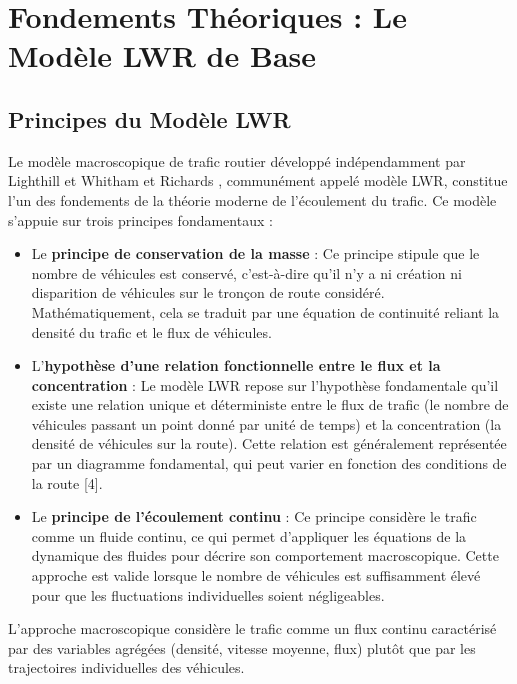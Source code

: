 \chapter{Fondements Théoriques : Le Modèle LWR de Base}
\label{chap:fondements_theoriques}

\section{Principes du Modèle LWR}
\label{sec:principes_lwr}

Le modèle macroscopique de trafic routier développé indépendamment par Lighthill et Whitham \cite{lighthill1955kinematic} et Richards \cite{richards1956shock}, communément appelé modèle LWR, constitue l'un des fondements de la théorie moderne de l'écoulement du trafic. Ce modèle s'appuie sur trois principes fondamentaux :

\begin{itemize}
    \item Le \textbf{principe de conservation de la masse}  : Ce principe stipule que le nombre de véhicules est conservé, c'est-à-dire qu'il n'y a ni création ni disparition de véhicules sur le tronçon de route considéré. Mathématiquement, cela se traduit par une équation de continuité reliant la densité du trafic et le flux de véhicules.
    \item L'\textbf{hypothèse d'une relation fonctionnelle entre le flux et la concentration}  : Le modèle LWR repose sur l'hypothèse fondamentale qu'il existe une relation unique et déterministe entre le flux de trafic (le nombre de véhicules passant un point donné par unité de temps) et la concentration (la densité de véhicules sur la route). Cette relation est généralement représentée par un diagramme fondamental, qui peut varier en fonction des conditions de la route [4].
    \item Le \textbf{principe de l'écoulement continu} : Ce principe considère le trafic comme un fluide continu, ce qui permet d'appliquer les équations de la dynamique des fluides pour décrire son comportement macroscopique. Cette approche est valide lorsque le nombre de véhicules est suffisamment élevé pour que les fluctuations individuelles soient négligeables.
\end{itemize}

\begin{definition}
    L'approche macroscopique considère le trafic comme un flux continu caractérisé par des variables agrégées (densité, vitesse moyenne, flux) plutôt que par les trajectoires individuelles des véhicules.
    \end{definition}
    
